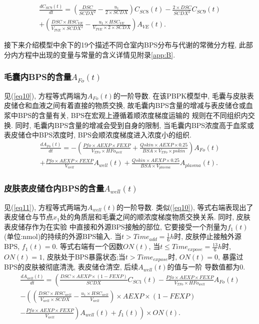 \documentclass[a4paper,punct=banjiao,twoside]{ctexrep}
\theoremstyle{plain}
\theoremstyle{definition}
\theoremstyle{remark}
\begin{document}
\begin{multline}\label{eq3}
  \frac{dC_{SC9}(t)}{dt}=\left(\frac{DSC}{SCDX^2} -\frac{u_1}{2 \times  SCDX}\right)C_{SC8}(t)-\frac{2 \times DSC}{SCDX^2}  C_{SC9}(t)\\
  +\left(\frac{DSC \times  HSC_{VE}}{V_{TVE}  \times  SCDX^2 }-\frac{u_1  \times  HSC_{VE}}{V_{TVE}  \times  2 \times  SCDX}\right)A_{VE}(t) .
\end{multline}

接下来介绍模型中余下的19个描述不同仓室内BPS分布与代谢的常微分方程, 此部分内方程中出现的变量与常量的含义详情见附录\ref{app:B}.
\subsubsection*{毛囊内BPS的含量$A_{Fo}(t)$}
见(\ref{eq10}), 方程等式两端为$A_{Fo}(t)$的一阶导数. 在该PBPK模型中, 毛囊与皮肤表皮储仓和血液之间有着直接的物质交换, 故毛囊内BPS含量的增减与表皮储仓或血浆中BPS的含量有关, BPS在宏观上遵循着顺浓度梯度运输的
规则在不同组织内交换. 同时, 毛囊内BPS含量的增减会受到自身的限制, 当毛囊内BPS浓度高于血浆或表皮储仓中BPS浓度时, BPS会顺浓度梯度进入浓度小的组织.
\begin{multline}\label{eq10}
  \frac{dA_{Fo}(t)}{dt} = -\left(\frac{Pfo \times  AEXP \times  FEXP}{V_{TFo}  \times  HFo_{well} }
  +\frac{Qskin \times  AEXP \times  0.25}{BSA \times  V_{TFo}  \times  pskin}\right)A_{Fo}(t)\\
  +\frac{Pfo \times  AEXP \times  FEXP}{V_{well}  }A_{well}(t)+\frac{Qskin \times  AEXP \times  0.25}{BSA \times  V_{plasma}} A_{plasma}(t).
\end{multline}

\subsubsection*{皮肤表皮储仓内BPS的含量$A_{well}(t)$}
见(\ref{eq11}), 方程等式两端为$A_{well}(t)$的一阶导数. 类似(\ref{eq10}), 等式右端表现出了表皮储仓与节点$x_1$处的角质层和毛囊之间的顺浓度梯度物质交换关系. 同时, 皮肤表皮储存作为在实验
中直接和外源BPS接触的部位, 它要接受一个剂量为$f_1 (t)$(单位:nmol)的持续的外源BPS输入. 当$t>Time_{add}=\frac{1}{6}h$时, 皮肤停止接触外源BPS, $f_1 (t)=0$. 
等式右端有一个因数$ON(t)$, 当$t\leq Time_{expose}=\frac{13}{6}h$时, $ON(t)=1$, 皮肤处于BPS暴露状态;当$t> Time_{expose}$时, $ON(t)=0$, 暴露过BPS的皮肤被彻底清洗, 表皮储仓清空, 后续$A_{well}(t)$的值与一阶
导数值都为0.
\begin{multline}\label{eq11}
  \frac{dA_{well}(t)}{dt} = \left(\frac{DSC \times  AEXP \times  (1-FEXP)}{SCDX} C_{SC1}(t)-\frac{Pfo \times  AEXP \times  FEXP}{V_{TFo} \times  HFo_{well}} A_{Fo}(t)\right.\\
  \left. -\left(\left(\frac{DSC \times  HSC_{well}}{V_{well} \times  SCDX}-\frac{u_1 \times  HSC_{well}}{V_{well} }\right) \times  AEXP \times  (1-FEXP) \right.\right.\\
  \left.\left.-\frac{Pfo \times  AEXP \times  FEXP}{V_{well}} \right)A_{well}(t)+f_1 (t) \right) \times  ON(t).
\end{multline}
\end{document}
